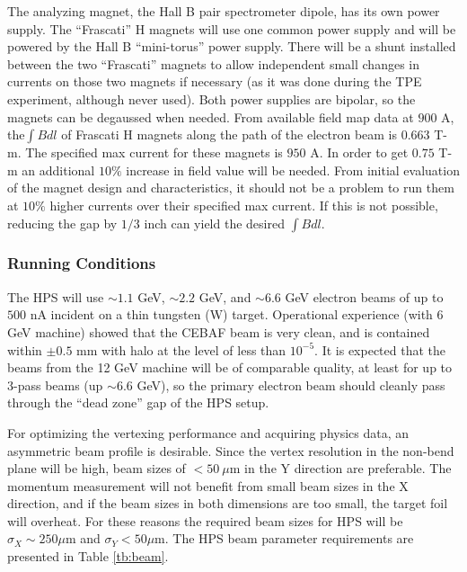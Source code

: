 The analyzing magnet, the Hall B pair spectrometer dipole, has its own power supply. The ``Frascati'' H magnets will use one common power 
supply and will be powered by the Hall B ``mini-torus'' power supply. There will be a shunt installed between the two ``Frascati'' magnets 
to allow independent small changes in currents on those two magnets if necessary (as it was done during the TPE experiment, although 
never used). Both power supplies are bipolar, so the magnets can be degaussed when needed. From available field map data at $900$ A, 
the$\int{Bdl}$ of Frascati H magnets along the path of the electron beam is $0.663$ T-m. The specified max current for these magnets 
is $950$ A. In order to get $0.75$ T-m an additional $10\%$ increase in field value will be needed. From initial evaluation of the 
magnet design and characteristics, it should not be a problem to run them at $10\%$ higher currents over their specified max current. 
If this is not possible, reducing the gap by $1/3$ inch can yield the desired $\int{Bdl}$. 

 
\clearpage

\subsubsection{Running Conditions} 
 
The HPS will use $\sim 1.1$ GeV, $\sim 2.2$ GeV, and $\sim 6.6$ GeV electron beams of up to $500$ nA incident on a thin tungsten (W) target. 
Operational experience (with 6 GeV machine) showed that the CEBAF beam is very clean, and is contained within $\pm 0.5$ mm with halo at the level 
of less than $10^{-5}$. It is expected that the beams from the 12 GeV machine will be of comparable quality, at least for up to 3-pass 
beams (up $\sim 6.6$ GeV), so the primary electron beam should cleanly pass through the ``dead zone'' gap of the HPS setup. 
 
For optimizing the vertexing performance and acquiring physics data, an asymmetric beam profile is desirable. Since the vertex resolution 
in the non-bend plane will be high, beam sizes of $<50 ~\mu$m in the Y direction are preferable. The momentum measurement will not benefit 
from small beam sizes in the X direction, and if the beam sizes in both dimensions are too small, the target foil will overheat. For these reasons the 
required beam sizes for HPS will be $\sigma_X \sim 250 \mu$m and $\sigma_Y < 50 \mu$m.
The HPS beam parameter requirements are presented in Table \ref{tb:beam}. 
 
